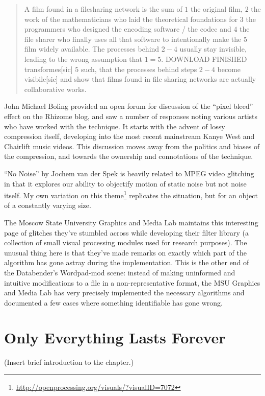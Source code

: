 \documentclass{thesis}
\begin{document}
	\begin{quote}
	A film found in a filesharing network is the sum of $1$ the original film, $2$ the work of the mathematicians who laid the theoretical foundations for $3$ the programmers who designed the encoding software / the codec and $4$ the file sharer who finally uses all that software to intentionally make the $5$ film widely available. The processes behind $2-4$ usually stay invisible, leading to the wrong assumption that $1=5$. DOWNLOAD FINISHED transformes[sic] $5$ such, that the processes behind steps $2-4$ become visibile[sic] and show that films found in file sharing networks are actually collaborative works.
	\end{quote}
	
	John Michael Boling provided an open forum for discussion of the ``pixel bleed'' effect on the Rhizome blog\cite{john_michael_boling_rhizome_????}, and saw a number of responses noting various artists who have worked with the technique. It starts with the advent of lossy compression itself, developing into the most recent mainstream Kanye West and Chairlift music videos. This discussion moves away from the politics and biases of the compression, and towards the ownership and connotations of the technique.
	
	``No Noise'' by Jochem van der Spek\cite{jochem_van_der_spek_no_2001} is heavily related to MPEG video glitching in that it explores our ability to objectify motion of static noise but not noise itself. My own variation on this theme\footnote{\url{http://openprocessing.org/visuals/?visualID=7072}} replicates the situation, but for an object of a constantly varying size.
	
	The Moscow State University Graphics and Media Lab maintains this interesting page of glitches\cite{nikolai_trunichkin_and_dr._dmitriy_vatolin_crazy_????} they've stumbled across while developing their filter library (a collection of small visual processing modules used for research purposes). The unusual thing here is that they've made remarks on exactly which part of the algorithm has gone astray during the implementation. This is the other end of the Databender's Wordpad-mod scene: instead of making uninformed and intuitive modifications to a file in a non-representative format, the MSU Graphics and Media Lab has very precisely implemented the necessary algorithms and documented a few cases where something identifiable has gone wrong.
	
\chapter{Only Everything Lasts Forever}
(Insert brief introduction to the chapter.)
\end{document}
